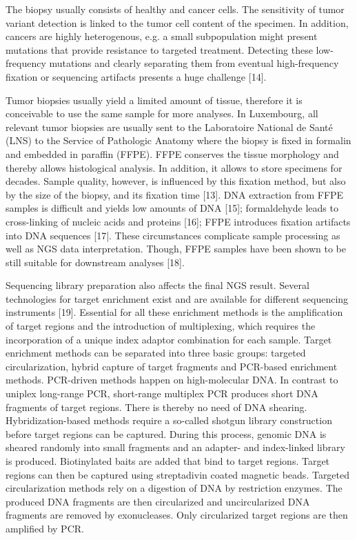 The biopsy usually consists of healthy and cancer cells. The sensitivity of tumor variant detection is linked to the tumor cell content of the specimen. In addition, cancers are highly heterogenous, e.g. a small subpopulation might present mutations that provide resistance to targeted treatment. Detecting these low-frequency mutations and clearly separating them from eventual high-frequency fixation or sequencing artifacts presents a huge challenge [14].

Tumor biopsies usually yield a limited amount of tissue, therefore it is conceivable to use the same sample for more analyses. In Luxembourg, all relevant tumor biopsies are usually sent to the Laboratoire National de Santé (LNS) to the Service of Pathologic Anatomy where the biopsy is fixed in formalin and embedded in paraffin (FFPE). FFPE conserves the tissue morphology and thereby allows histological analysis. In addition, it allows to store specimens for decades. Sample quality, however, is influenced by this fixation method, but also by the size of the biopsy, and its fixation time [13]. DNA extraction from FFPE samples is difficult and yields low amounts of DNA [15]; formaldehyde leads to cross-linking of nucleic acids and proteins [16]; FFPE introduces fixation artifacts into DNA sequences [17|. These circumstances complicate sample processing as well as NGS data interpretation. Though, FFPE samples have been shown to be still suitable for downstream analyses [18].

Sequencing library preparation also affects the final NGS result. Several technologies for target enrichment exist and are available for different sequencing instruments [19]. Essential for all these enrichment methods is the amplification of target regions and the introduction of multiplexing, which requires the incorporation of a unique index adaptor combination for each sample. Target enrichment methods can be separated into three basic groups: targeted circularization, hybrid capture of target fragments and PCR-based enrichment methods. PCR-driven methods happen on high-molecular DNA. In contrast to uniplex long-range PCR, short-range multiplex PCR produces short DNA fragments of target regions. There is thereby no need of DNA shearing. Hybridization-based methods require a so-called shotgun library construction before target regions can be captured. During this process, genomic DNA is sheared randomly into small fragments and an adapter- and index-linked library is produced. Biotinylated baits are added that bind to target regions. Target regions can then be captured using streptadivin coated magnetic beads. Targeted circularization methods rely on a digestion of DNA by restriction enzymes. The produced DNA fragments are then circularized and uncircularized DNA fragments are removed by exonucleases. Only circularized target regions are then amplified by PCR.


